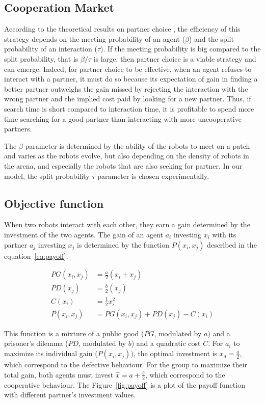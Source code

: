\subsection{Cooperation Market} \label{sec:market}
According to the theoretical results on partner choice \citep{Debove2015b}, the efficiency of this strategy depends on the meeting probability of an agent ($\beta$) and the split probability of an interaction ($\tau$). If the meeting probability is big compared to the split probability, that is $\beta/\tau$ is large, then partner choice is a viable strategy and can emerge. Indeed, for partner choice to be effective, when an agent refuses to interact with a partner, it must do so because its expectation of gain in finding a better partner outweighs the gain missed by rejecting the interaction with the wrong partner and the implied cost paid by looking for a new partner. Thus, if search time is short compared to interaction time, it is profitable to spend more time searching for a good partner than interacting with more uncooperative partners.

The $\beta$ parameter is determined by the ability of the robots to meet on a patch and varies as the robots evolve, but also depending on the density of robots in the arena, and especially the robots that are also seeking for partner. In our model, the split probability $\tau$ parameter is chosen experimentally.

\subsection{Objective function}

When two robots interact with each other, they earn a gain determined by the investment of the two agents. The gain of an agent $a_i$ investing $x_i$ with its partner $a_j$ investing $x_j$ is determined by the function $P(x_i, x_j)$ described in the equation~\ref{eq:payoff}.

\begin{align}
PG(x_i, x_j) &= \frac{a}{2} (x_i + x_j) \\
PD(x_j) &= \frac{b}{2} (x_j) \\
C(x_i) &= \frac{1}{2} x_i^2 \\
P(x_i, x_j)& = PG(x_i, x_j) + PD(x_j) - C(x_i) \label{eq:payoff}
\end{align}

This function is a mixture of a public good ($PG$, modulated by $a$) and a prisoner's dilemma ($PD$, modulated by $b$) and a quadratic cost $C$. For $a_i$ to maximize its individual gain ($P(x_i, x_j)$), the optimal investment is $x_d = \frac{a}{2}$, which correspond to the defective behaviour. For the group to maximize their total gain, both agents must invest $\hat{x} = a + \frac{b}{2}$, which correspond to the cooperative behaviour. The Figure~\ref{fig:payoff} is a plot of the payoff function with different partner's investment values.



